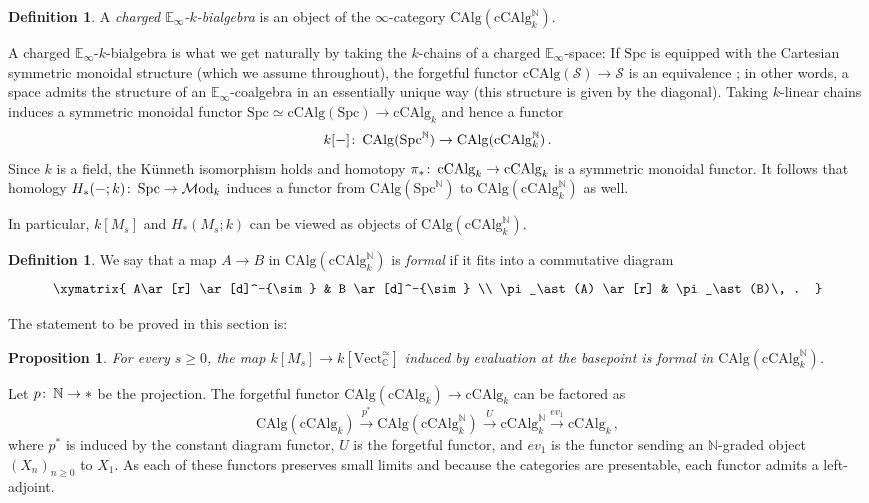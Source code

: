 \documentclass[oneside, a4paper, 12pt]{article}
\numberwithin{equation}{section}
\newcommand{\Mod}{\mathcal{M}\mathrm{od}}
\newcommand{\CAlg}{\mathrm{CAlg}}
\newcommand{\cCAlg}{\mathrm{cCAlg}}
\newcommand{\Spc}{\mathrm{Spc}}
\newcommand{\C}{\mathbb{C}}
\newcommand{\N}{\mathbb{N}}
\newcommand{\Vect}{\mathrm{Vect}}
\newcommand{\co}{\colon\thinspace}
\theoremstyle{plain}
\newtheorem{proposition}[theorem]{Proposition}
\theoremstyle{definition}
\newtheorem{definition}[theorem]{Definition}
\theoremstyle{remark}
\begin{document}
\begin{definition}
A \emph{charged $\mathbb{E}_\infty$-$k$-bialgebra} is an object of the $\infty$-category $\CAlg(\cCAlg_k^\N)$.
\end{definition}

A charged $\mathbb{E}_\infty$-$k$-bialgebra is what we get naturally by taking the $k$-chains of a charged $\mathbb{E}_\infty$-space: If $\Spc$ is equipped with the Cartesian symmetric monoidal structure (which we assume throughout), the forgetful functor $\cCAlg(\mathcal{S})\to \mathcal{S}$ is an equivalence \cite[2.4.3.10]{HA}; in other words, a space admits the structure of an $\mathbb{E}_\infty$-coalgebra in an essentially unique way (this structure is given by the diagonal). Taking $k$-linear chains induces a symmetric monoidal functor $\Spc\simeq \cCAlg(\Spc)\to \cCAlg_k$ and hence a functor
\[
k[-]\co \CAlg(\Spc^\N) \to \CAlg(\cCAlg_k^\N)\, .
\]
Since $k$ is a field, the K{\"u}nneth isomorphism holds and homotopy $\pi_\ast \co \cCAlg_k\to \cCAlg_k$ is a symmetric monoidal functor. It follows that homology $H_\ast(-;k)\co \Spc\to \Mod_k$ induces a functor from $\CAlg(\Spc^\N)$ to $\CAlg(\cCAlg_k^\N)$ as well.


In particular, $k[M_s]$ and $H_\ast(M_s;k)$ can be viewed as objects of $\CAlg(\cCAlg_k^\N)$.

\begin{definition}
We say that a map $A\to B$ in $\CAlg(\cCAlg_k^\N)$ is \emph{formal} if it fits into a commutative diagram
\[
\xymatrix{
A\ar[r] \ar[d]^-{\sim} & B \ar[d]^-{\sim} \\
\pi_\ast(A) \ar[r] & \pi_\ast(B)\, .
}
\]
\end{definition}


The statement to be proved in this section is:
\begin{proposition} \label{prop:keyformality}
For every $s\geq 0$, the map $k[M_s]\to k[\Vect^\simeq_\C]$ induced by evaluation at the basepoint is formal in $\CAlg(\cCAlg_k^\N)$.
\end{proposition}

Let $p\co \N\to \ast$ be the projection. The forgetful functor $\CAlg(\cCAlg_k)\to \cCAlg_k$ can be factored as
\[
\CAlg(\cCAlg_k) \xrightarrow{p^\ast} \CAlg(\cCAlg_k^\N) \xrightarrow{U} \cCAlg_k^\N \xrightarrow{ev_1} \cCAlg_k\, ,
\]
where $p^\ast$ is induced by the constant diagram functor, $U$ is the forgetful functor, and $ev_1$ is the functor sending an $\N$-graded object $(X_n)_{n\geq 0}$ to $X_1$. As each of these functors preserves small limits \cite[3.2.2.5]{HA} and because the categories are presentable, each functor admits a left-adjoint.
\end{document}
